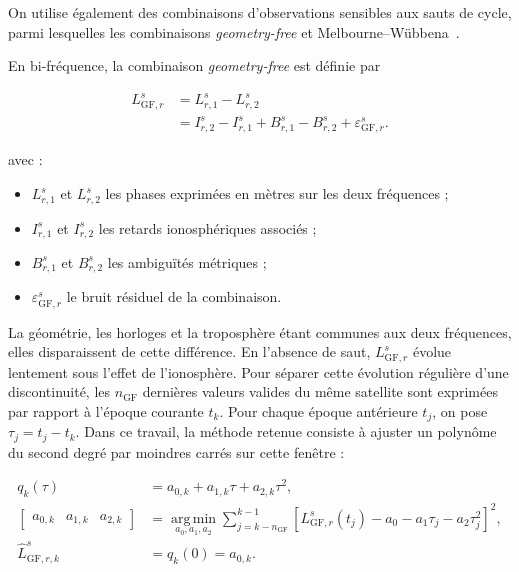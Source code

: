 On utilise également des combinaisons d'observations sensibles aux sauts de
cycle, parmi lesquelles les combinaisons \textit{geometry-free} et
Melbourne--Wübbena~\cite{blewitt1990,melbourne1985,wubbena1985}.

En bi-fréquence, la combinaison \textit{geometry-free} est définie par

\begin{align}
L_{\mathrm{GF},r}^s
&=
L_{r,1}^s-L_{r,2}^s
\\
&=
I_{r,2}^s-I_{r,1}^s
+B_{r,1}^s-B_{r,2}^s
+\varepsilon_{\mathrm{GF},r}^s.
\label{eq:geometry_free_slip}
\end{align}

avec :

\begin{itemize}
    \item $L_{r,1}^s$ et $L_{r,2}^s$ les phases exprimées en mètres sur les
    deux fréquences ;
    \item $I_{r,1}^s$ et $I_{r,2}^s$ les retards ionosphériques associés ;
    \item $B_{r,1}^s$ et $B_{r,2}^s$ les ambiguïtés métriques ;
    \item $\varepsilon_{\mathrm{GF},r}^s$ le bruit résiduel de la combinaison.
\end{itemize}

La géométrie, les horloges et la troposphère étant communes aux deux
fréquences, elles disparaissent de cette différence. En l'absence de saut,
$L_{\mathrm{GF},r}^s$ évolue lentement sous l'effet de l'ionosphère. Pour
séparer cette évolution régulière d'une discontinuité, les $n_{\mathrm{GF}}$
dernières valeurs valides du même satellite sont exprimées par rapport à
l'époque courante $t_k$. Pour chaque époque antérieure $t_j$, on pose
$\tau_j=t_j-t_k$. Dans ce travail, la méthode retenue consiste à ajuster un
polynôme du second degré par moindres
carrés sur cette fenêtre :

\begin{align}
q_k(\tau)
&=
a_{0,k}+a_{1,k}\tau+a_{2,k}\tau^2,
\\
\begin{bmatrix}
a_{0,k} & a_{1,k} & a_{2,k}
\end{bmatrix}
&=
\underset{a_0,a_1,a_2}{\operatorname{arg\,min}}
\sum_{j=k-n_{\mathrm{GF}}}^{k-1}
\left[
L_{\mathrm{GF},r}^s(t_j)
-a_0-a_1\tau_j-a_2\tau_j^2
\right]^2,
\\
\widehat L_{\mathrm{GF},r,k}^s
&=
q_k(0)=a_{0,k}.
\label{eq:geometry_free_prediction}
\end{align}

